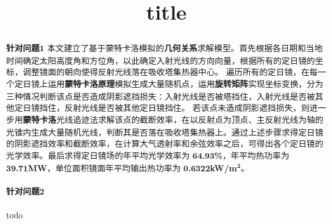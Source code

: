 \documentclass{myclass}
\title{title}
\begin{document}
\begin{abstract}
\textbf{针对问题1} 本文建立了基于蒙特卡洛模拟的\textbf{几何关系}求解模型。首先根据各日期和当地时间确定太阳高度角和方位角，以此确定入射光线的方向向量，根据所有的定日镜的坐标，调整镜面的朝向使得反射光线落在吸收塔集热器中心。
遍历所有的定日镜，在每一个定日镜上运用\textbf{蒙特卡洛原理}模拟生成大量随机点，运用\textbf{旋转矩阵}实现坐标变换，分为三种情况判断该点是否造成阴影遮挡损失：入射光线是否被塔挡住，入射光线是否被其他定日镜挡住，反射光线是否被其他定日镜挡住。
若该点未造成阴影遮挡损失，则进一步用\textbf{蒙特卡洛}光线追迹法求解该点的截断效率，在以反射点为顶点、主反射光线为轴的光锥内生成大量随机光线，判断其是否落在吸收塔集热器上。通过上述步骤求得定日镜的阴影遮挡效率和截断效率，在计算大气透射率和余弦效率之后，可得出各个定日镜的光学效率。最后求得定日镜场的年平均光学效率为 \textbf{64.93\%}，年平均热功率为 \textbf{39.71MW}，单位面积镜面年平均输出热功率为 \textbf{0.6322kW/m}\({}^{\mathbf{2}}\)。
\paragraph{针对问题2}
todo
\end{abstract}







\end{document}
